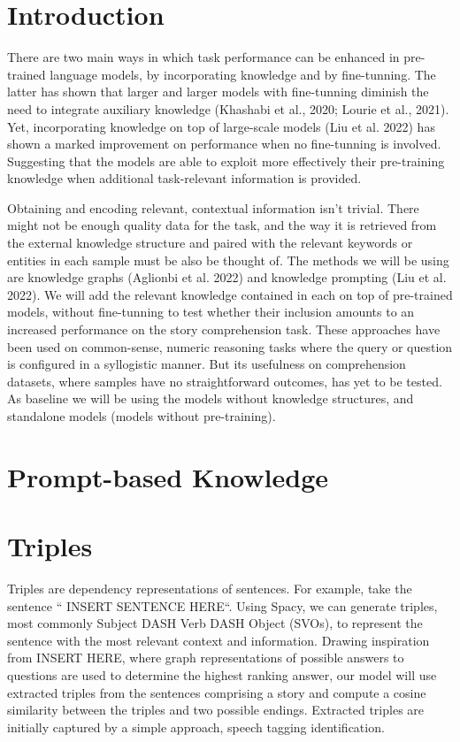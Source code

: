 \documentclass{article}
\begin{document}
\begin{multicols}{2}
\section{Introduction}
There are two main ways in which task performance can be enhanced in pre-trained language models, by incorporating knowledge and by fine-tunning. The latter has shown that larger and larger models with fine-tunning diminish the need to integrate auxiliary knowledge (Khashabi et al., 2020; Lourie et al., 2021). Yet, incorporating knowledge on top of large-scale models (Liu et al. 2022) has shown a marked improvement on performance when no fine-tunning is involved. Suggesting that the models are able to exploit more effectively their pre-training knowledge when additional task-relevant information is provided. 

Obtaining and encoding relevant, contextual information isn't trivial. There might not be enough quality data for the task, and the way it is retrieved from the external knowledge structure and paired with the relevant keywords or entities in each sample must be also be thought of. 
The methods we will be using are knowledge graphs (Aglionbi et al. 2022) and knowledge prompting (Liu et al. 2022). We will add the relevant knowledge contained in each on top of pre-trained models, without fine-tunning to test whether their inclusion amounts to an increased performance on the story comprehension task. These approaches have been used on common-sense, numeric reasoning tasks where the query or question is configured in a syllogistic manner. But its usefulness on comprehension datasets, where samples have no straightforward outcomes, has yet to be tested. As baseline we will be using the models without knowledge structures, and standalone models (models without pre-training). 

\section{Prompt-based Knowledge}
\lipsum[3-4]

\section{Triples}
Triples are dependency representations of sentences. For example, take the sentence “ INSERT SENTENCE HERE“. Using Spacy, we can generate triples, 
most commonly Subject DASH Verb DASH Object (SVOs), to represent the sentence with the most relevant context and information. Drawing inspiration from 
INSERT HERE, where graph representations of possible answers to questions are used to determine the highest ranking answer, our model will use 
extracted triples from the sentences comprising a story and compute a cosine similarity between the triples and two possible endings. Extracted 
triples are initially captured by a simple approach, speech tagging identification. 


\end{multicols}
\end{document}
